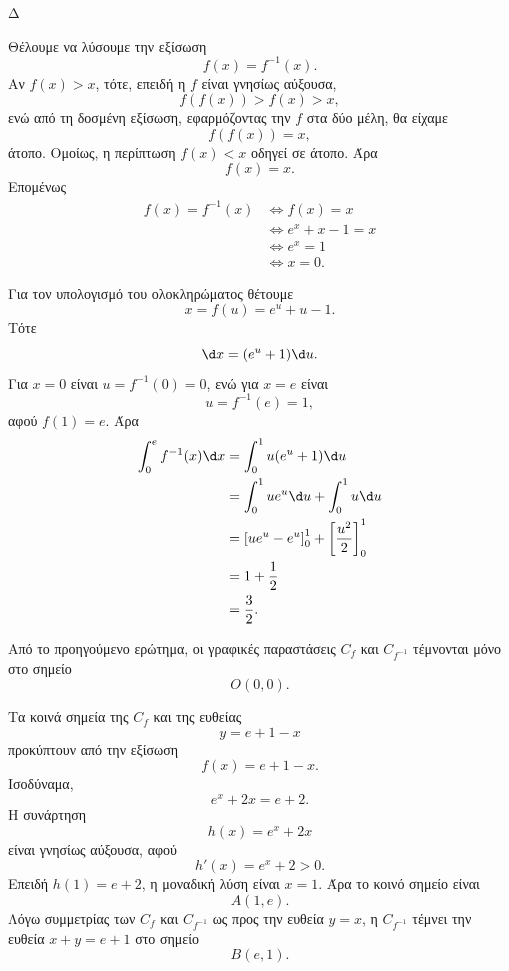 \begin{thema}{Δ}
\begin{erwthma}
Θέλουμε να λύσουμε την εξίσωση
\[
f(x)=f^{-1}(x).
\]
Αν $f(x)>x$, τότε, επειδή η $f$ είναι γνησίως αύξουσα,
\[
f(f(x))>f(x)>x,
\]
ενώ από τη δοσμένη εξίσωση, εφαρμόζοντας την $f$ στα δύο μέλη, θα είχαμε
\[
f(f(x))=x,
\]
άτοπο. Ομοίως, η περίπτωση $f(x)<x$ οδηγεί σε άτοπο. Άρα
\[
f(x)=x.
\]
Επομένως
\begin{align*}
f(x)=f^{-1}(x)
&\Leftrightarrow f(x)=x\\
&\Leftrightarrow e^x+x-1=x\\
&\Leftrightarrow e^x=1\\
&\Leftrightarrow {x=0}.
\end{align*}

Για τον υπολογισμό του ολοκληρώματος θέτουμε
\[
x=f(u)=e^u+u-1.
\]
Τότε
\[
\d x=(e^u+1)\d u.
\]
Για $x=0$ είναι $u=f^{-1}(0)=0$, ενώ για $x=e$ είναι
\[
u=f^{-1}(e)=1,
\]
αφού $f(1)=e$. Άρα
\begin{align*}
\int_0^e f^{-1}(x)\d x
&=\int_0^1u(e^u+1)\d u\\
&=\int_0^1ue^u\d u+\int_0^1u\d u\\
&=\left[ue^u-e^u\right]_0^1
+\left[\frac{u^2}{2}\right]_0^1\\
&=1+\frac{1}{2}\\
&={\frac{3}{2}}.
\end{align*}

\item Από το προηγούμενο ερώτημα, οι γραφικές παραστάσεις $C_f$ και $C_{f^{-1}}$ τέμνονται μόνο στο σημείο
\[
O(0,0).
\]

Τα κοινά σημεία της $C_f$ και της ευθείας
\[
y=e+1-x
\]
προκύπτουν από την εξίσωση
\[
f(x)=e+1-x.
\]
Ισοδύναμα,
\[
e^x+2x=e+2.
\]
Η συνάρτηση
\[
h(x)=e^x+2x
\]
είναι γνησίως αύξουσα, αφού
\[
h'(x)=e^x+2>0.
\]
Επειδή $h(1)=e+2$, η μοναδική λύση είναι $x=1$. Άρα το κοινό σημείο είναι
\[
A(1,e).
\]
Λόγω συμμετρίας των $C_f$ και $C_{f^{-1}}$ ως προς την ευθεία $y=x$, η $C_{f^{-1}}$ τέμνει την ευθεία $x+y=e+1$ στο σημείο
\[
B(e,1).
\]


\end{erwthma}
\end{thema}
